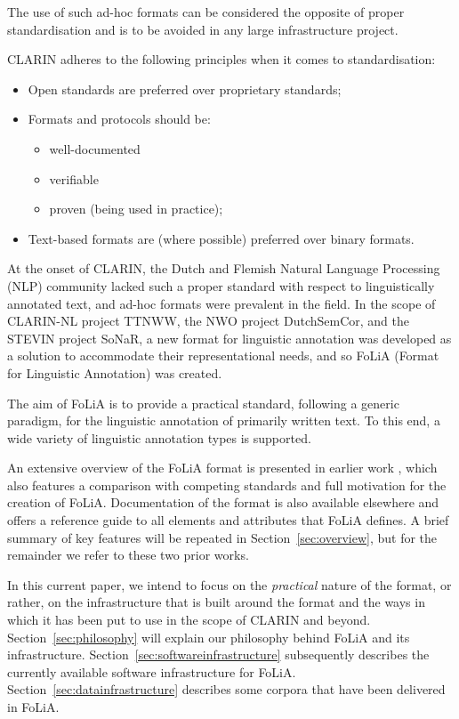 \documentclass[a4paper,11pt]{article}
\begin{document}
The use of such ad-hoc formats can be considered the opposite of proper
standardisation and is to be avoided in any large infrastructure project. 

CLARIN adheres to the following principles when it comes to standardisation:

\begin{itemize}
    \item Open standards are preferred over proprietary standards;
    \item Formats and protocols should be:
    \begin{itemize}
        \item well-documented
        \item verifiable
        \item proven (being used in practice);
    \end{itemize}
    \item Text-based formats are (where possible) preferred over binary formats.
\end{itemize}

At the onset of CLARIN, the Dutch and Flemish Natural Language Processing (NLP)
community lacked such a proper standard with respect to linguistically
annotated text, and ad-hoc formats were prevalent in the field.  In the scope
of CLARIN-NL project TTNWW, the NWO project DutchSemCor, and the STEVIN project
SoNaR, a new format for linguistic annotation was developed as a solution to
accommodate their representational needs, and so FoLiA (Format for Linguistic
Annotation) was created.

The aim of FoLiA is to provide a practical standard, following a generic
paradigm, for the linguistic annotation of primarily written text. To this end,
a wide variety of linguistic annotation types is supported. 

An extensive overview of the FoLiA format is presented in earlier work \cite{FOLIACLIN2013},
which also features a comparison with competing standards and full motivation
for the creation of FoLiA. Documentation of the format is also available
elsewhere \cite{FOLIADOC2014} and offers a reference guide to all elements and attributes
that FoLiA defines.  A brief summary of key features will be repeated in
Section~\ref{sec:overview}, but for the remainder we refer to these two prior
works.

In this current paper, we intend to focus on the \emph{practical} nature of the
format, or rather, on the infrastructure that is built around the format and
the ways in which it has been put to use in the scope of CLARIN and beyond.
Section~\ref{sec:philosophy} will explain our philosophy behind FoLiA and its
infrastructure. Section~\ref{sec:softwareinfrastructure} subsequently describes
the currently available software infrastructure for FoLiA.
Section~\ref{sec:datainfrastructure} describes some corpora that have been
delivered in FoLiA.
\end{document}
